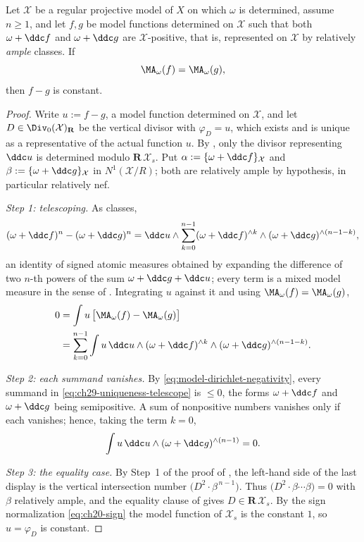 \begin{proposition}
\label{prop:ch29-model-uniqueness}
Let $\mathcal X$ be a regular projective model of $X$ on which
$\omega$ is determined, assume $n\geq1$, and let $f,g$ be model functions determined on
$\mathcal X$ such that both $\omega+\ddc f$ and $\omega+\ddc g$ are
$\mathcal X$-positive, that is, represented on $\mathcal X$ by
relatively \emph{ample} classes.  If
\[
 \MA_\omega(f)=\MA_\omega(g),
\]
then $f-g$ is constant.
\end{proposition}

\begin{proof}
Write $u:=f-g$, a model function determined on $\mathcal X$, and let
$D\in\Div_0(\mathcal X)_{\mathbf R}$ be the vertical divisor with
$\varphi_D=u$, which exists and is unique as a representative of the actual function
$u$.  By , only the divisor representing
$\ddc u$ is determined modulo $\mathbf R\,\mathcal X_s$.  Put
$\alpha:=\{\omega+\ddc f\}_{\mathcal X}$ and
$\beta:=\{\omega+\ddc g\}_{\mathcal X}$ in $N^1(\mathcal X/R)$; both are
relatively ample by hypothesis, in particular relatively nef.

\emph{Step 1: telescoping.}  As classes,
\[
 (\omega+\ddc f)^n-(\omega+\ddc g)^n
 =\ddc u\wedge\sum_{k=0}^{n-1}
   (\omega+\ddc f)^{\wedge k}\wedge(\omega+\ddc g)^{\wedge(n-1-k)} ,
\]
an identity of signed atomic measures obtained by expanding the difference
of two $n$-th powers of the sum $\omega+\ddc g+\ddc u$; every term is a
mixed model measure in the sense of .
Integrating $u$ against it and using
$\MA_\omega(f)=\MA_\omega(g)$,
\begin{equation}
\label{eq:ch29-uniqueness-telescope}
 \begin{aligned}
 0&=\int u\,\bigl[\MA_\omega(f)-\MA_\omega(g)\bigr]\\
  &=\sum_{k=0}^{n-1}
    \int u\,\ddc u\wedge(\omega+\ddc f)^{\wedge k}
      \wedge(\omega+\ddc g)^{\wedge(n-1-k)} .
 \end{aligned}
\end{equation}

\emph{Step 2: each summand vanishes.}  By
\eqref{eq:model-dirichlet-negativity}, every summand in
\eqref{eq:ch29-uniqueness-telescope} is $\leq0$, the forms
$\omega+\ddc f$ and $\omega+\ddc g$ being semipositive.  A sum of
nonpositive numbers vanishes only if each vanishes; hence, taking the term
$k=0$,
\[
 \int u\,\ddc u\wedge(\omega+\ddc g)^{\wedge(n-1)}=0 .
\]

\emph{Step 3: the equality case.}  By Step~1 of the proof of
, the left-hand side of the last
display is the vertical intersection number
$\bigl(D^2\cdot\beta^{\,n-1}\bigr)$.  Thus
$\bigl(D^2\cdot\beta\cdots\beta\bigr)=0$ with $\beta$ relatively ample,
and the equality clause of  gives
$D\in\mathbf R\,\mathcal X_s$.  By the sign normalization
\eqref{eq:ch20-sign} the model function of $\mathcal X_s$ is the constant
$1$, so $u=\varphi_D$ is constant.
\end{proof}


